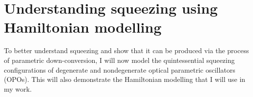 

\section{Understanding squeezing using Hamiltonian modelling}


To better understand squeezing and show that it can be produced via the process of parametric down-conversion, I will now model the quintessential squeezing configurations of degenerate and nondegenerate optical parametric oscillators (OPOs). This will also demonstrate the Hamiltonian modelling that I will use in my work.

